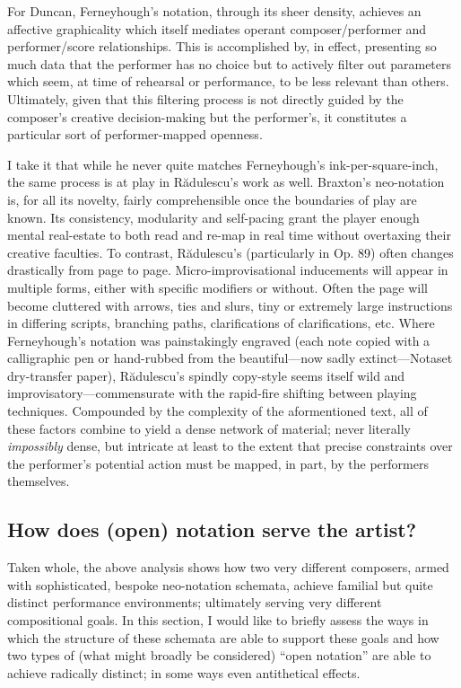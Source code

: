         For Duncan, Ferneyhough's notation, through its sheer density, achieves an affective graphicality which itself mediates operant composer/performer and performer/score relationships. This is accomplished by, in effect, presenting so much data that the performer has no choice but to actively filter out parameters which seem, at time of rehearsal or performance, to be less relevant than others. Ultimately, given that this filtering process is not directly guided by the composer's creative decision-making but the performer's, it constitutes a particular sort of performer-mapped openness.
        
        I take it that while he never quite matches Ferneyhough's ink-per-square-inch, the same process is at play in R\u{a}dulescu's work as well. Braxton's neo-notation is, for all its novelty, fairly comprehensible once the boundaries of play are known. Its consistency, modularity and self-pacing grant the player enough mental real-estate to both read and re-map in real time without overtaxing their creative faculties. To contrast, R\u{a}dulescu's (particularly in Op. 89) often changes drastically from page to page. Micro-improvisational inducements will appear in multiple forms, either with specific modifiers or without. Often the page will become cluttered with arrows, ties and slurs, tiny or extremely large instructions in differing scripts, branching paths, clarifications of clarifications, etc. Where Ferneyhough's notation was painstakingly engraved (each note copied with a calligraphic pen or hand-rubbed from the beautiful---now sadly extinct---Notaset dry-transfer paper), R\u{a}dulescu's spindly copy-style seems itself wild and improvisatory---commensurate with the rapid-fire shifting between playing techniques. Compounded by the complexity of the aformentioned text, all of these factors combine to yield a dense network of material; never literally \textit{impossibly} dense, but intricate at least to the extent that precise constraints over the performer's potential action must be mapped, in part, by the performers themselves.

\subsection{How does (open) notation serve the artist?}

    Taken whole, the above analysis shows how two very different composers, armed with sophisticated, bespoke neo-notation schemata, achieve familial but quite distinct performance environments; ultimately serving very different compositional goals. In this section, I would like to briefly assess the ways in which the structure of these schemata are able to support these goals and how two types of (what might broadly be considered) ``open notation'' are able to achieve radically distinct; in some ways even antithetical effects.

